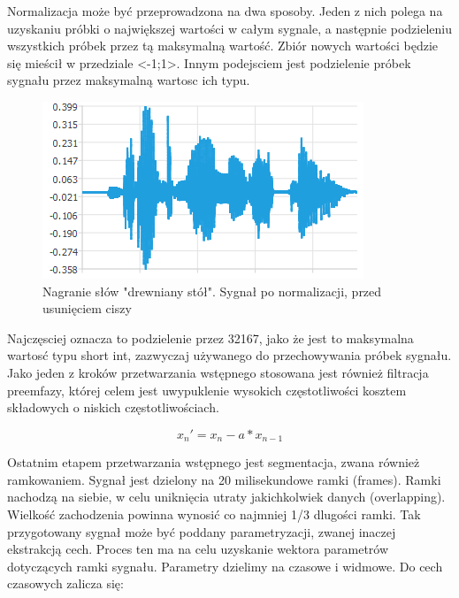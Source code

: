 \documentclass[a4paper,12 pt]{article}
\begin{document}
Normalizacja może być przeprowadzona na dwa sposoby. Jeden z nich polega na  uzyskaniu próbki o największej wartości w całym sygnale, a następnie podzieleniu wszystkich próbek przez tą maksymalną wartość. Zbiór nowych wartości będzie się mieścił w przedziale <-1;1>.
 Innym podejsciem jest podzielenie próbek sygnału przez maksymalną wartosc ich typu. 
\begin{figure}[h]

\centering
\includegraphics{stol_waveform}
\caption{Nagranie słów "drewniany stół". Sygnał po normalizacji, przed usunięciem ciszy}

\end{figure}
\FloatBarrier
Najczęsciej oznacza to podzielenie przez 32167, jako że jest to maksymalna wartosć typu short int, zazwyczaj używanego do przechowywania próbek sygnału.
Jako jeden z kroków przetwarzania wstępnego stosowana jest również filtracja preemfazy, której celem jest uwypuklenie wysokich częstotliwości kosztem składowych o niskich częstotliwościach.
\begin{mycapequ}[h]

\begin{equation}
x_{n}'=x_{n} - a*x_{n-1}       
\end{equation}
\caption{Filtracja preemfazy,  a=0.97 }
\end{mycapequ} 
\FloatBarrier
Ostatnim etapem przetwarzania wstępnego jest segmentacja, zwana również ramkowaniem. Sygnał jest dzielony na 20 milisekundowe ramki (frames). Ramki nachodzą na siebie, w celu uniknięcia utraty jakichkolwiek danych (overlapping). Wielkość zachodzenia powinna wynosić co najmniej 1/3 dlugości ramki. Tak przygotowany sygnał może być poddany parametryzacji, zwanej inaczej ekstrakcją cech. 
Proces ten ma na celu uzyskanie wektora parametrów dotyczących ramki sygnału.
\newline Parametry dzielimy na czasowe i widmowe.
Do cech czasowych zalicza się:
\end{document}
